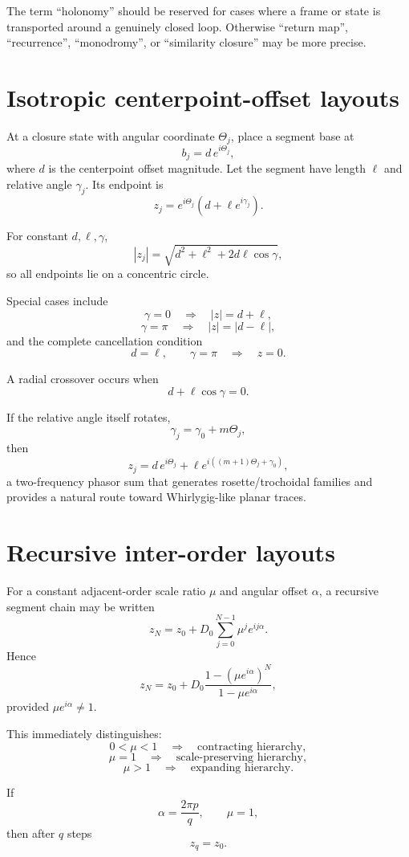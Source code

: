 \documentclass[11pt]{article}
\begin{document}
The term ``holonomy'' should be reserved for cases where a frame or state is
transported around a genuinely closed loop.  Otherwise ``return map'',
``recurrence'', ``monodromy'', or ``similarity closure'' may be more precise.

\section{Isotropic centerpoint-offset layouts}

At a closure state with angular coordinate $\Theta_j$, place a segment base at
\[
b_j=d\,e^{i\Theta_j},
\]
where $d$ is the centerpoint offset magnitude.  Let the segment have length
$\ell$ and relative angle $\gamma_j$.  Its endpoint is
\[
z_j
=
e^{i\Theta_j}
\left(
d+\ell e^{i\gamma_j}
\right).
\]

For constant $d,\ell,\gamma$,
\[
|z_j|
=
\sqrt{d^2+\ell^2+2d\ell\cos\gamma},
\]
so all endpoints lie on a concentric circle.

Special cases include
\[
\gamma=0
\quad\Rightarrow\quad
|z|=d+\ell,
\]
\[
\gamma=\pi
\quad\Rightarrow\quad
|z|=|d-\ell|,
\]
and the complete cancellation condition
\[
d=\ell,\qquad\gamma=\pi
\quad\Rightarrow\quad
z=0.
\]

A radial crossover occurs when
\[
d+\ell\cos\gamma=0.
\]

If the relative angle itself rotates,
\[
\gamma_j=\gamma_0+m\Theta_j,
\]
then
\[
z_j
=
d\,e^{i\Theta_j}
+
\ell e^{i((m+1)\Theta_j+\gamma_0)},
\]
a two-frequency phasor sum that generates rosette/trochoidal families and
provides a natural route toward Whirlygig-like planar traces.

\section{Recursive inter-order layouts}

For a constant adjacent-order scale ratio $\mu$ and angular offset $\alpha$, a
recursive segment chain may be written
\[
z_N
=
z_0+
D_0\sum_{j=0}^{N-1}\mu^j e^{ij\alpha}.
\]
Hence
\[
z_N
=
z_0+
D_0
\frac{1-(\mu e^{i\alpha})^N}
     {1-\mu e^{i\alpha}},
\]
provided $\mu e^{i\alpha}\neq1$.

This immediately distinguishes:
\[
0<\mu<1
\quad\Rightarrow\quad
\text{contracting hierarchy},
\]
\[
\mu=1
\quad\Rightarrow\quad
\text{scale-preserving hierarchy},
\]
\[
\mu>1
\quad\Rightarrow\quad
\text{expanding hierarchy}.
\]

If
\[
\alpha=\frac{2\pi p}{q},
\qquad
\mu=1,
\]
then after $q$ steps
\[
z_q=z_0.
\]
\end{document}
